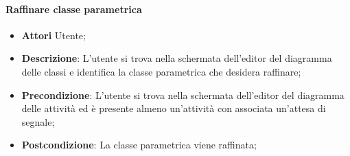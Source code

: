 \paragraph{Raffinare classe parametrica}
\begin{itemize}
	\item \textbf{Attori} Utente;
	\item \textbf{Descrizione}: L'utente si trova nella schermata dell'editor del diagramma delle classi e identifica la classe parametrica che desidera raffinare;
	\item \textbf{Precondizione}: L'utente si trova nella schermata dell'editor del diagramma delle attività ed è presente almeno un'attività con associata un'attesa di segnale;
	\item \textbf{Postcondizione}: La classe parametrica viene raffinata;
\end{itemize}